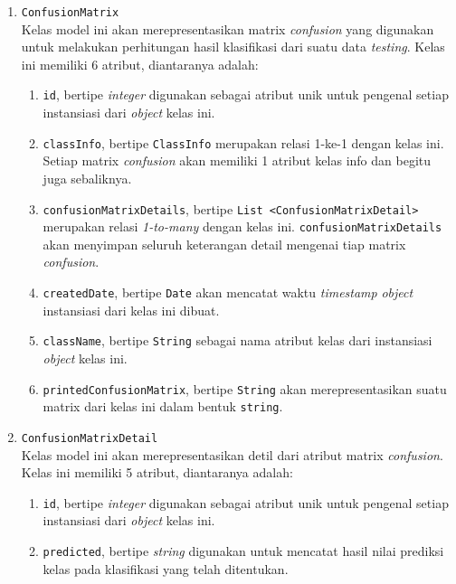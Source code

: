 \begin{enumerate}
	\item \texttt{ConfusionMatrix}\\
	Kelas model ini akan merepresentasikan matrix \textit{confusion} yang digunakan untuk melakukan perhitungan hasil klasifikasi dari suatu data \textit{testing}. Kelas ini memiliki 6 atribut, diantaranya adalah:
	\begin{enumerate}
		\item \texttt{id}, bertipe \textit{integer} digunakan sebagai atribut unik untuk pengenal setiap instansiasi dari \textit{object} kelas ini.

		\item \texttt{classInfo}, bertipe \texttt{ClassInfo} merupakan relasi 1-ke-1 dengan kelas ini. Setiap matrix \textit{confusion} akan memiliki 1 atribut kelas info dan begitu juga sebaliknya.
	
		\item \texttt{confusionMatrixDetails}, bertipe \texttt{List <ConfusionMatrixDetail>} merupakan relasi \textit{1-to-many} dengan kelas ini. \texttt{confusionMatrixDetails} akan menyimpan seluruh keterangan detail mengenai tiap matrix \textit{confusion}.

		\item \texttt{createdDate}, bertipe \texttt{Date} akan mencatat waktu \textit{timestamp} \textit{object} instansiasi dari kelas ini dibuat.		

		\item \texttt{className}, bertipe \texttt{String} sebagai nama atribut kelas dari instansiasi \textit{object} kelas ini.

		\item \texttt{printedConfusionMatrix}, bertipe \texttt{String} akan merepresentasikan suatu matrix dari kelas ini dalam bentuk \texttt{string}.

	\end{enumerate}		
	
	\item \texttt{ConfusionMatrixDetail}\\
	Kelas model ini akan merepresentasikan detil dari atribut matrix \textit{confusion}. Kelas ini memiliki 5 atribut, diantaranya adalah:
	\begin{enumerate}
		\item \texttt{id}, bertipe \textit{integer} digunakan sebagai atribut unik untuk pengenal setiap instansiasi dari \textit{object} kelas ini.
				

		\item \texttt{predicted}, bertipe \textit{string} digunakan untuk mencatat hasil nilai prediksi kelas pada klasifikasi yang telah ditentukan.
		


\end{enumerate}
\end{enumerate}
